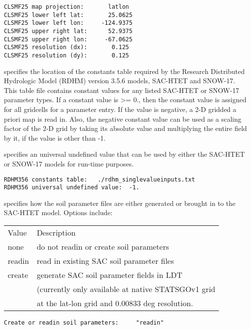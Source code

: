  \begin{Verbatim}[frame=single]
CLSMF25 map projection:       latlon
CLSMF25 lower left lat:       25.0625
CLSMF25 lower left lon:     -124.9375
CLSMF25 upper right lat:      52.9375
CLSMF25 upper right lon:     -67.0625
CLSMF25 resolution (dx):       0.125
CLSMF25 resolution (dy):       0.125
 \end{Verbatim}

 
  specifies the location of
  the constants table required by the Research Distributed 
  Hydrologic Model (RDHM) version 3.5.6 models, SAC-HTET and SNOW-17.
  This table file contains constant values for any listed SAC-HTET
  or SNOW-17 parameter types.  If a constant value is >= 0., then
  the constant value is assigned for all gridcells for a parameter entry.
  If the value is negative, a 2-D gridded a priori map is read in.
  Also, the negative constant value can be used as a scaling factor
  of the 2-D grid by taking its absolute value and multiplying the
  entire field by it, if the value is other than -1.

  specifies an universal
  undefined value that can be used by either the SAC-HTET or SNOW-17
  models for run-time purposes.
 
 \begin{Verbatim}[frame=single]
RDHM356 constants table:   ./rdhm_singlevalueinputs.txt
RDHM356 universal undefined value:  -1.
 \end{Verbatim}

 
  specifies how the 
 soil parameter files are either generated or brought in to
 the SAC-HTET model.
 Options include:

 \begin{tabular}{ll}
 Value   & Description                  \\
 none    &  do not readin or create soil parameters \\
 readin  &  read in existing SAC soil parameter files \\
 create  &  generate SAC soil parameter fields in LDT \\
         &  (currently only available at native STATSGOv1 grid\\
         &  at the lat-lon grid and 0.00833 deg resolution.  \\
 \end{tabular}
 
 \begin{Verbatim}[frame=single]
Create or readin soil parameters:     "readin"   
 \end{Verbatim}

